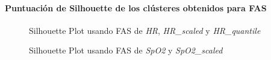 \paragraph{Puntuación de Silhouette de los clústeres obtenidos para FAS}

\begin{figure}[H]
    \centering
    \caption{Silhouette Plot usando FAS de \textit{HR}, \textit{HR\_scaled} y \textit{HR\_quantile}}\label{fig:acf_si_fc}
\end{figure}

\begin{figure}[ht]
    \centering
    \hfill
    \caption{Silhouette Plot usando FAS de \textit{SpO2} y \textit{SpO2\_scaled}}\label{fig:acf_si_spo2}
\end{figure}


